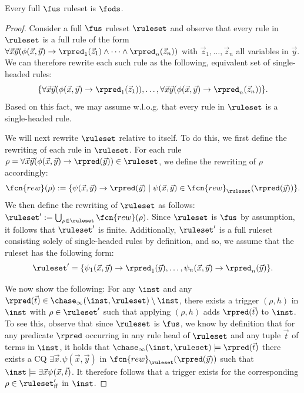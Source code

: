 \begin{proposition}
Every full $\fus$ ruleset is $\fods$.
\end{proposition}
\begin{proof}
Consider a full $\fus$ ruleset $\ruleset$ and observe that every rule in $\ruleset$ is a full rule of the form $\forall \vec{x} \vec{y}(\phi(\vec{x},\vec{y}) \rightarrow \rpred_{1}(\vec{z}_{1}) \land \cdots \land \rpred_{n}(\vec{z}_{n}))$ with $\vec{z}_{1}, \ldots, \vec{z}_{n}$ all variables in $\vec{y}$. We can therefore rewrite each such rule as the following, equivalent set of single-headed rules:
$$
\{\forall \vec{x} \vec{y}(\phi(\vec{x},\vec{y}) \rightarrow \rpred_{1}(\vec{z}_{1})), \ldots, \forall \vec{x} \vec{y}(\phi(\vec{x},\vec{y}) \rightarrow \rpred_{n}(\vec{z}_{n}))\}.
$$%
Based on this fact, we may assume w.l.o.g. that every rule in $\ruleset$ is a single-headed rule.

We will next rewrite $\ruleset$ relative to itself. To do this, we first define the rewriting of each rule in $\ruleset$. For each rule $\rho = \forall \vec{x} \vec{y}(\phi(\vec{x},\vec{y}) \rightarrow \rpred(\vec{y})) \in \ruleset$, we define the rewriting of $\rho$ accordingly:
$$
\fcn{rew}(\rho) := \{\psi(\vec{x}, \vec{y}) \rightarrow \rpred(\vec{y}) \mid  \psi(\vec{x},\vec{y}) \in \fcn{rew}_{\ruleset}(\rpred(\vec{y})) \}.
$$%
We then define the rewriting of $\ruleset$ as follows: $\ruleset' := \bigcup_{\rho \in \ruleset} \fcn{rew}(\rho)$. Since $\ruleset$ is $\fus$ by assumption, it follows that $\ruleset'$ is finite. Additionally, $\ruleset'$ is a full ruleset consisting solely of single-headed rules by definition, and so, we assume that the ruleset has the following form:
$$
\ruleset' = \{\psi_{1}(\vec{x}, \vec{y}) \rightarrow \rpred_{1}(\vec{y}), \ldots, \psi_{n}(\vec{x}, \vec{y}) \rightarrow \rpred_{n}(\vec{y})\}.
$$

We now show the following: For any $\inst$ and any $\rpred(\vec{t}) \in \chase_{\infty}(\inst,\ruleset) \setminus \inst$, there exists a trigger $(\rho,h)$ in $\inst$ with $\rho \in \ruleset'$ such that applying $(\rho,h)$ adds $\rpred(\vec{t})$ to $\inst$. To see this, observe that since $\ruleset$ is $\fus$, we know by definition that for any predicate $\rpred$ occurring in any rule head of $\ruleset$ and any tuple $\vec{t}$ of terms in $\inst$, it holds that 
$\chase_{\infty}(\inst, \ruleset) \models \rpred(\vec{t})$ \iffi 
there exists a CQ $\exists\vec{x}.\psi(\vec{x},\vec{y})$ in $\fcn{rew}_{\ruleset}(\rpred(\vec{y}))$ such that  $\inst \models \exists \vec{x} \psi(\vec{x},\vec{t})$. It therefore follows that a trigger exists for the corresponding $\rho \in \ruleset_{\smash{\mathrm{ff}}}'$ in $\inst$.


\end{proof}
